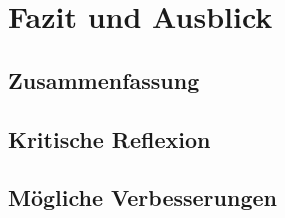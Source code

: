\chapter{Fazit und Ausblick}\label{chap:fazit-und-ausblick}


\section{Zusammenfassung}\label{sec:zusammenfassung}


\section{Kritische Reflexion}\label{sec:kritische-reflexion}


\section{Mögliche Verbesserungen}\label{sec:moegliche-verbesserungen}

